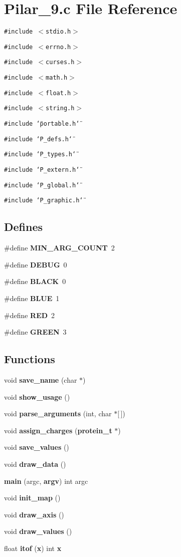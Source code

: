 \section{Pilar\_\-9.c File Reference}
\label{Pilar__9_8c}
{\tt \#include $<$stdio.h$>$}\par
{\tt \#include $<$errno.h$>$}\par
{\tt \#include $<$curses.h$>$}\par
{\tt \#include $<$math.h$>$}\par
{\tt \#include $<$float.h$>$}\par
{\tt \#include $<$string.h$>$}\par
{\tt \#include \char`\"{}portable.h\char`\"{}}\par
{\tt \#include \char`\"{}P\_\-defs.h\char`\"{}}\par
{\tt \#include \char`\"{}P\_\-types.h\char`\"{}}\par
{\tt \#include \char`\"{}P\_\-extern.h\char`\"{}}\par
{\tt \#include \char`\"{}P\_\-global.h\char`\"{}}\par
{\tt \#include \char`\"{}P\_\-graphic.h\char`\"{}}\par
\subsection*{Defines}
\begin{CompactItemize}
\item 
\#define {\bf MIN\_\-ARG\_\-COUNT}\ 2
\item 
\#define {\bf DEBUG}\ 0
\item 
\#define {\bf BLACK}\ 0
\item 
\#define {\bf BLUE}\ 1
\item 
\#define {\bf RED}\ 2
\item 
\#define {\bf GREEN}\ 3
\end{CompactItemize}
\subsection*{Functions}
\begin{CompactItemize}
\item 
void {\bf save\_\-name} (char $\ast$)
\item 
void {\bf show\_\-usage} ()
\item 
void {\bf parse\_\-arguments} (int, char $\ast$[$\,$])
\item 
void {\bf assign\_\-charges} ({\bf protein\_\-t} $\ast$)
\item 
void {\bf save\_\-values} ()
\item 
void {\bf draw\_\-data} ()
\item 
{\bf main} (argc, {\bf argv}) int argc
\item 
void {\bf init\_\-map} ()
\item 
void {\bf draw\_\-axis} ()
\item 
void {\bf draw\_\-values} ()
\item 
float {\bf itof} ({\bf x}) int {\bf x}
\end{CompactItemize}
